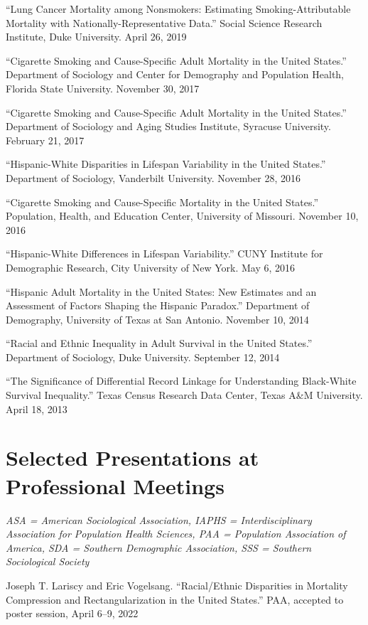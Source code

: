 \documentclass[11pt,]{article}
\begin{document}
``Lung Cancer Mortality among Nonsmokers: Estimating
Smoking-Attributable Mortality with Nationally-Representative Data.''
Social Science Research Institute, Duke University. April 26, 2019

``Cigarette Smoking and Cause-Specific Adult Mortality in the United
States.'' Department of Sociology and Center for Demography and
Population Health, Florida State University. November 30, 2017

``Cigarette Smoking and Cause-Specific Adult Mortality in the United
States.'' Department of Sociology and Aging Studies Institute, Syracuse
University. February 21, 2017

``Hispanic-White Disparities in Lifespan Variability in the United
States.'' Department of Sociology, Vanderbilt University. November 28,
2016

``Cigarette Smoking and Cause-Specific Mortality in the United States.''
Population, Health, and Education Center, University of Missouri.
November 10, 2016

``Hispanic-White Differences in Lifespan Variability.'' CUNY Institute
for Demographic Research, City University of New York. May 6, 2016

``Hispanic Adult Mortality in the United States: New Estimates and an
Assessment of Factors Shaping the Hispanic Paradox.'' Department of
Demography, University of Texas at San Antonio. November 10, 2014

``Racial and Ethnic Inequality in Adult Survival in the United States.''
Department of Sociology, Duke University. September 12, 2014

``The Significance of Differential Record Linkage for Understanding
Black-White Survival Inequality.'' Texas Census Research Data Center,
Texas A\&M University. April 18, 2013

\hypertarget{selected-presentations-at-professional-meetings}{%
\section{Selected Presentations at Professional
Meetings}\label{selected-presentations-at-professional-meetings}}

\emph{ASA = American Sociological Association, IAPHS = Interdisciplinary
Association for Population Health Sciences, PAA = Population Association
of America, SDA = Southern Demographic Association, SSS = Southern
Sociological Society}

Joseph T. Lariscy and Eric Vogelsang. ``Racial/Ethnic Disparities in
Mortality Compression and Rectangularization in the United States.''
PAA, accepted to poster session, April 6--9, 2022
\end{document}

